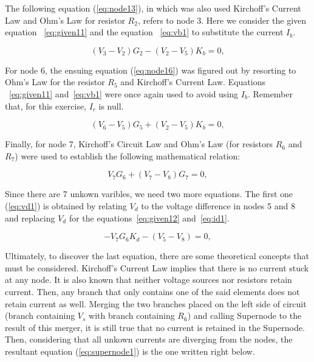 The following equation (\ref{eq:node13}), in which was also used Kirchoff's Current Law and Ohm's Law for resistor $R_2$, refers to node 3. Here we consider the given equation ~\ref{eq:given11} and the equation ~\ref{eq:vb1} to substitute the current $I_b$.

\begin{equation}
  (V_{3} - V_{2})G_{2} - (V_{2} - V_{5})K_{b} = 0,
  \label{eq:node13}
\end{equation}

For node 6, the ensuing equation (\ref{eq:node16}) was figured out by resorting to Ohm's Law for the resistor $R_5$ and Kirchoff's Current Law. Equations ~\ref{eq:given11} and~\ref{eq:vb1} were once again used to avoid using $I_b$. Remember that, for this exercise, $I_c$ is null.

\begin{equation}
  (V_{6} - V_{5})G_{5} + (V_{2} - V_{5})K_{b} = 0,
  \label{eq:node16}
\end{equation}

Finally, for node 7, Kirchoff's Circuit Law and Ohm's Law (for resistors $R_6$ and $R_7$) were used to establish the following mathematical relation:

\begin{equation}
  V_{7}G_{6} + (V_{7} - V_{8})G_{7} = 0,
  \label{eq:node17}
\end{equation}

Since there are 7 unkown varibles, we need two more equations. The first one (\ref{eq:vd1}) is obtained by relating $V_d$ to the voltage difference in nodes 5 and 8 and replacing $V_d$ for the equations~\ref{eq:given12} and~\ref{eq:id1}.

\begin{equation}
  -V_{7}G_{6}K_{d} - (V_{5} - V_{8}) = 0,
  \label{eq:vd1}
\end{equation}

Ultimately, to discover the last equation, there are some theoretical concepts that must be considered. Kirchoff's Current Law implies that there is no current stuck at any node. It is also known that neither voltage sources nor resistors retain current. Then, any branch that only contains one of the said elements does not retain current as well. Merging the two branches placed on the left side of circuit (branch containing $V_s$ with branch containing $R_6$) and calling Supernode to the result of this merger, it is still true that no current is retained in the Supernode. Then, considering that all unkown currents are diverging from the nodes, the resultant equation (\ref{eq:supernode1}) is the one written right below.

